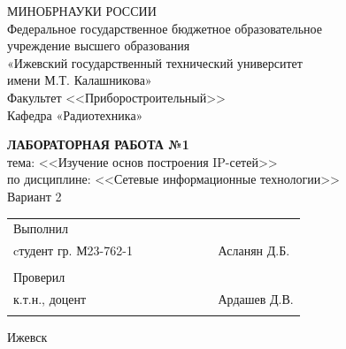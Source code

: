  \begin{center}  МИНОБРНАУКИ РОССИИ\\Федеральное государственное бюджетное образовательное\\
  учреждение высшего образования\\«Ижевский государственный технический университет \\имени М.Т. Калашникова»\\  Факультет <<Приборостроительный>>\\Кафедра «Радиотехника»\\
 \end{center} %
 \vfill\vfill 
 \begin{center}{\bf\MakeTextUppercase{Лабораторная работа №1}}\\  тема: <<Изучение основ построения IP-сетей>>\\по дисциплине: <<Сетевые информационные технологии>>\\Вариант 2
 \end{center} \vfill
 \vfill \noindent
 \begin{tabular}{p{0.7\linewidth}l}  Выполнил & \\cтудент гр. М23-762-1 & Асланян Д.Б.\\
  & \\Проверил& \\  к.т.н., доцент & Ардашев Д.В.\\& \\
 \end{tabular} \vfill
 \begin{center}  Ижевск \the\year{}
 \end{center} \newpage
 \pagestyle{plain} \parindent=1.25cm
